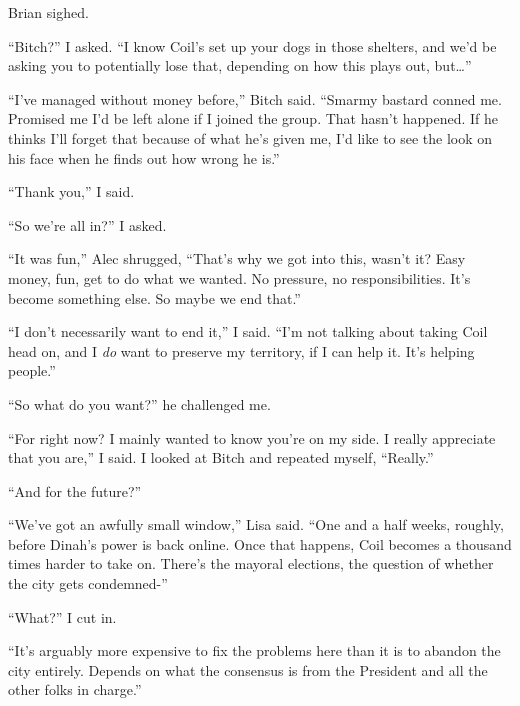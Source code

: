 Brian sighed.



``Bitch?'' I asked.  ``I know Coil's set up your dogs in those shelters, and we'd be asking you to potentially lose that, depending on how this plays out, but\ldots''



``I've managed without money before,'' Bitch said.  ``Smarmy bastard conned me.  Promised me I'd be left alone if I joined the group.  That hasn't happened.  If he thinks I'll forget that because of what he's given me, I'd like to see the look on his face when he finds out how wrong he is.''



``Thank you,'' I said.



``So we're all in?'' I asked.



``It was fun,'' Alec shrugged, ``That's why we got into this, wasn't it?  Easy money, fun, get to do what we wanted.  No pressure, no responsibilities.  It's become something else.  So maybe we end that.''



``I don't necessarily want to end it,'' I said.  ``I'm not talking about taking Coil head on, and I \emph{do} want to preserve my territory, if I can help it.  It's helping people.''



``So what do you want?'' he challenged me.



``For right now?  I mainly wanted to know you're on my side.  I really appreciate that you are,'' I said.  I looked at Bitch and repeated myself, ``Really.''



``And for the future?''



``We've got an awfully small window,'' Lisa said.  ``One and a half weeks, roughly, before Dinah's power is back online.  Once that happens, Coil becomes a thousand times harder to take on.  There's the mayoral elections, the question of whether the city gets condemned-''



``What?'' I cut in.



``It's arguably more expensive to fix the problems here than it is to abandon the city entirely.  Depends on what the consensus is from the President and all the other folks in charge.''



